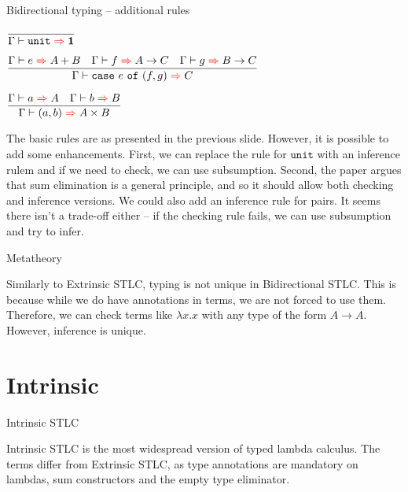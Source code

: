 \documentclass{beamer}
\newcommand{\Fun}[2]{#1 \to #2}
\newcommand{\Prod}[2]{#1 \times #2}
\newcommand{\Sum}[2]{#1 + #2}
\newcommand{\Unit}{\textbf{1}}
\newcommand{\fun}[2]{\lambda #1. #2}
\newcommand{\pair}[2]{(#1, #2)}
\newcommand{\case}[3]{\texttt{case}\ #1\ \texttt{of}\ (#2, #3)}
\newcommand{\unit}{\texttt{unit}}
\newcommand{\rulename}[1]{\textsc{\footnotesize{#1}}}
\newcommand{\infrule}[3][]{\displaystyle \frac{#2}{#3} \rulename{#1}}
\begin{document}
\begin{frame}{Bidirectional typing -- additional rules}

\begin{center}
  $\infrule{}{\infer{\unit}{\Unit}}$

  \vspace{1em}

  $\infrule{\infer{e}{\Sum{A}{B}} \quad \infer{f}{\Fun{A}{C}} \quad \infer{g}{\Fun{B}{C}}}{\infer{\case{e}{f}{g}}{C}}$

  \vspace{1em}

  $\infrule{\infer{a}{A} \quad \infer{b}{B}}{\infer{\pair{a}{b}}{\Prod{A}{B}}}$
\end{center}

\vspace{1em}

The basic rules are as presented in the previous slide. However, it is possible to add some enhancements. First, we can replace the rule for $\unit$ with an inference rulem and if we need to check, we can use subsumption. Second, the paper argues that sum elimination is a general principle, and so it should allow both checking and inference versions. We could also add an inference rule for pairs. It seems there isn't a trade-off either -- if the checking rule fails, we can use subsumption and try to infer.

\end{frame}

\begin{frame}{Metatheory}

Similarly to Extrinsic STLC, typing is not unique in Bidirectional STLC. This is because while we do have annotations in terms, we are not forced to use them. Therefore, we can check terms like $\fun{x}{x}$ with any type of the form $\Fun{A}{A}$. However, inference is unique.

\end{frame}

\section{Intrinsic}

\newcommand{\ifun}[3]{\lambda #1 : #2. #3}
\newcommand{\iinl}[2]{\texttt{inl}_{#1}\ #2}
\newcommand{\iinr}[2]{\texttt{inr}_{#1}\ #2}
\newcommand{\iexfalso}[2]{\texttt{exfalso}_{#1}\ #2}

\newcommand{\termdiff}[1]{\mathcolor{red}{#1}}

\begin{frame}{Intrinsic STLC}

Intrinsic STLC is the most widespread version of typed lambda calculus. The terms differ from Extrinsic STLC, as type annotations are mandatory on lambdas, sum constructors and the empty type eliminator.

\end{frame}
\end{document}
